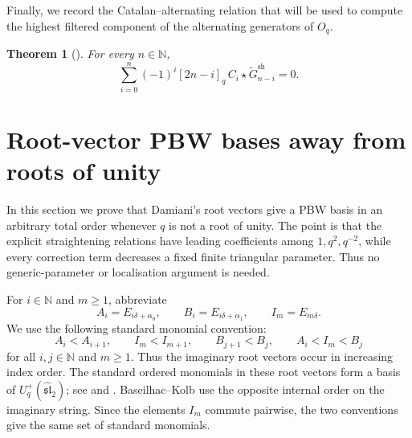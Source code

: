 \documentclass[11pt]{extarticle}
\newtheorem{theorem}{Theorem}[section]
\theoremstyle{definition}
\theoremstyle{remark}
\numberwithin{equation}{section}
\newcommand{\N}{\mathbb N}
\newcommand{\Oq}{O_q}
\newcommand{\Uplus}{U_q^+(\widehat{\mathfrak{sl}}_2)}
\newcommand{\sh}{\mathrm{sh}}
\begin{document}
Finally, we record the Catalan--alternating relation that will be used to
compute the highest filtered component of the alternating generators of
\(\Oq\).

\begin{theorem}[{{\cite[Theorem~11.14]{Terwilliger2019Alternating}}}]
\label{thm:Catalan-alternating}
For every \(n\in\N\),
\begin{equation}
\label{eq:Catalan-alternating}
        \sum_{i=0}^{n}(-1)^i[2n-i]_q\,
        C_i\star\widetilde G_{n-i}^{\sh}=0 .
\end{equation}
\end{theorem}



\section{Root-vector PBW bases away from roots of unity}
\label{sec:specialisation}

In this section we prove that Damiani's root vectors give a PBW basis in an
arbitrary total order whenever $q$ is not a root of unity.  The point is
that the explicit straightening relations have leading coefficients among
$1,q^2,q^{-2}$, while every correction term decreases a fixed finite
triangular parameter.  Thus no generic-parameter or localisation argument
is needed.

For $i\in\N$ and $m\geq1$, abbreviate
\[
 A_i=E_{i\delta+\alpha_0},\qquad
 B_i=E_{i\delta+\alpha_1},\qquad
 I_m=E_{m\delta}.
\]
We use the following standard monomial convention:
\begin{equation}
\label{eq:Damiani-standard-order}
 A_i<A_{i+1},\qquad I_m<I_{m+1},\qquad B_{j+1}<B_j,
 \qquad A_i<I_m<B_j
\end{equation}
for all $i,j\in\N$ and $m\geq1$.  Thus the imaginary root vectors occur in
increasing index order.  The standard ordered monomials in these root
vectors form a basis of $\Uplus$; see
\cite[Proposition~2.4]{Terwilliger2019Alternating} and
\cite[Section~5, Theorem~2]{Damiani1993}.  Baseilhac--Kolb use the opposite
internal order on the imaginary string.  Since the elements $I_m$ commute
pairwise, the two conventions give the same set of standard monomials.
\end{document}
